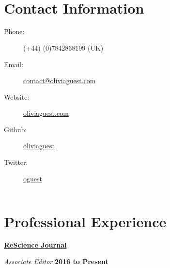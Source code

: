 \newenvironment{innerlist}[1][\enskip\textbullet]%
        {\begin{compactitem}[#1]}{\end{compactitem}}

\newcommand{\blankline}{\quad\pagebreak[2]}

% 

\usepackage{eurosym}



\latintext
{} \\ \


\section{Contact Information}
%
 
\begin{description}

 \item[Phone:] (+44) (0)7842868199 (UK)
 \item[Email:] \href{mailto:contact@oliviaguest.com}{contact@oliviaguest.com}
 \item[Website:] \href{http://oliviaguest.com}{oliviaguest.com}
 \item[Github:] \href{https://github.com/oliviaguest}{oliviaguest}
 \item[Twitter:] \href{https://twitter.com/o_guest}{o\textunderscore guest}\\ \


\end{description}

\section{Professional Experience}


\href{http://rescience.github.io/}{\textbf{ReScience Journal}}

\begin{outerlist}


\item[] \textit{Associate Editor}
        \hfill \textbf{2016 to Present}

\end{outerlist}

